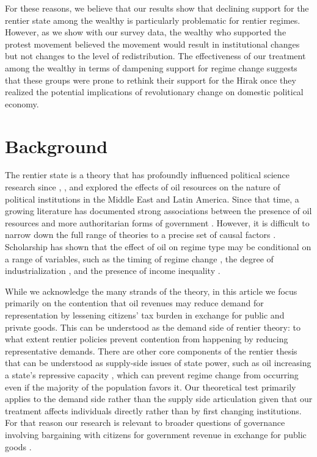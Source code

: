 \documentclass[12pt, letterpaper]{article}
\begin{document}
For these reasons, we believe that our results show that declining support for the rentier state among the wealthy is particularly problematic for rentier regimes. However, as we show with our survey data, the wealthy who supported the protest movement believed the movement would result in institutional changes but not changes to the level of redistribution. The effectiveness of our treatment among the wealthy in terms of dampening support for regime change suggests that these groups were prone to rethink their support for the Hirak once they realized the potential implications of revolutionary change on domestic political economy.

\section*{Background}

The rentier state is a theory that has profoundly influenced political science research since \textcite{mahdavy_hossein_patterns_1970},  \textcite{beblawi_rentier_1987}, \textcite{karl_paradox_1997} and \textcite{anderson_state_1987} explored the effects of oil resources on the nature of political institutions in the Middle East and Latin America. Since that time, a growing literature has documented strong associations between the presence of oil resources and more authoritarian forms of government \parencite{ross_does_2001,ross_oil_2012,ross_what_2015, andersen_big_2014}. However, it is difficult to narrow down the full range of theories to a precise set of causal factors \parencite{smith_rethinking_2021}. Scholarship has shown that the effect of oil on regime type may be conditional on a range of variables, such as the timing of regime change \parencite{houle_two-step_2018}, the degree of industrialization \parencite{brooks_oil_2016}, and the presence of income inequality \parencite{dunning_crude_2008}. 

While we acknowledge the many strands of the theory, in this article we focus primarily on the contention that oil revenues may reduce demand for representation by lessening citizens' tax burden in exchange for public and private goods. This can be understood as the demand side of rentier theory: to what extent rentier policies prevent contention from happening by reducing representative demands. There are other core components of the rentier thesis that can be understood as supply-side issues of state power, such as oil increasing a state's repressive capacity \parencite{ross_does_2001,bellin_robustness_2004,brownlee_arab_2015}, which can prevent regime change from occurring even if the majority of the population favors it. Our theoretical test primarily applies to the demand side rather than the supply side articulation given that our treatment affects individuals directly rather than by first changing institutions. For that reason our research is relevant to broader questions of governance involving bargaining with citizens for government revenue in exchange for public goods \parencite{bates_note_1985}.
\end{document}
